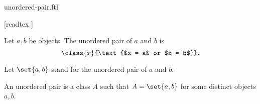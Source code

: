 \documentclass{stex}
\begin{document}
\begin{smodule}{unordered-pair.ftl}

  \begin{forthel}

    [readtex ]
  \end{forthel}

  \begin{forthel}
    \begin{definition}
      Let $a, b$ be objects.
      The unordered pair of $a$ and $b$ is
      \[\class{x}{\text{$x = a$ or $x = b$}}.\]
    \end{definition}

    Let $\set{a,b}$ stand for the unordered pair of $a$ and $b$.
  \end{forthel}

  \begin{forthel}
    \begin{definition}
      An unordered pair is a class $A$ such that $A = \set{a,b}$ for some distinct objects $a, b$.
    \end{definition}
  \end{forthel}
\end{smodule}
\end{document}
